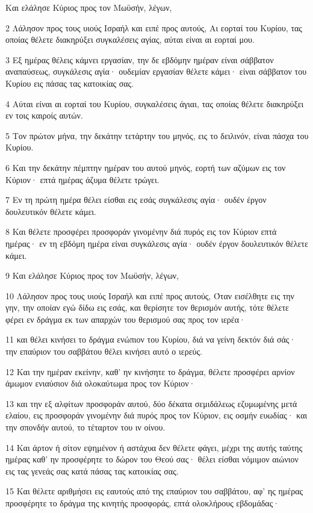 \par Και ελάλησε Κύριος προς τον Μωϋσήν, λέγων,
\par 2 Λάλησον προς τους υιούς Ισραήλ και ειπέ προς αυτούς, Αι εορταί του Κυρίου, τας οποίας θέλετε διακηρύξει συγκαλέσεις αγίας, αύται είναι αι εορταί μου.
\par 3 Εξ ημέρας θέλεις κάμνει εργασίαν, την δε εβδόμην ημέραν είναι σάββατον αναπαύσεως, συγκάλεσις αγία· ουδεμίαν εργασίαν θέλετε κάμει· είναι σάββατον του Κυρίου εις πάσας τας κατοικίας σας.
\par 4 Αύται είναι αι εορταί του Κυρίου, συγκαλέσεις άγιαι, τας οποίας θέλετε διακηρύξει εν τοις καιροίς αυτών.
\par 5 Τον πρώτον μήνα, την δεκάτην τετάρτην του μηνός, εις το δειλινόν, είναι πάσχα του Κυρίου.
\par 6 Και την δεκάτην πέμπτην ημέραν του αυτού μηνός, εορτή των αζύμων εις τον Κύριον· επτά ημέρας άζυμα θέλετε τρώγει.
\par 7 Εν τη πρώτη ημέρα θέλει είσθαι εις εσάς συγκάλεσις αγία· ουδέν έργον δουλευτικόν θέλετε κάμει.
\par 8 Και θέλετε προσφέρει προσφοράν γινομένην διά πυρός εις τον Κύριον επτά ημέρας· εν τη εβδόμη ημέρα είναι συγκάλεσις αγία· ουδέν έργον δουλευτικόν θέλετε κάμει.
\par 9 Και ελάλησε Κύριος προς τον Μωϋσήν, λέγων,
\par 10 Λάλησον προς τους υιούς Ισραήλ και ειπέ προς αυτούς, Όταν εισέλθητε εις την γην, την οποίαν εγώ δίδω εις εσάς, και θερίσητε τον θερισμόν αυτής, τότε θέλετε φέρει εν δράγμα εκ των απαρχών του θερισμού σας προς τον ιερέα·
\par 11 και θέλει κινήσει το δράγμα ενώπιον του Κυρίου, διά να γείνη δεκτόν διά σάς· την επαύριον του σαββάτου θέλει κινήσει αυτό ο ιερεύς.
\par 12 Και την ημέραν εκείνην, καθ' ην κινήσητε το δράγμα, θέλετε προσφέρει αρνίον άμωμον ενιαύσιον διά ολοκαύτωμα προς τον Κύριον·
\par 13 και την εξ αλφίτων προσφοράν αυτού, δύο δέκατα σεμιδάλεως εζυμωμένης μετά ελαίου, εις προσφοράν γινομένην διά πυρός προς τον Κύριον, εις οσμήν ευωδίας· και την σπονδήν αυτού, το τέταρτον του ιν οίνου.
\par 14 Και άρτον ή σίτον εψημένον ή αστάχυα δεν θέλετε φάγει, μέχρι της αυτής ταύτης ημέρας καθ' ην προσφέρητε το δώρον του Θεού σας· θέλει είσθαι νόμιμον αιώνιον εις τας γενεάς σας κατά πάσας τας κατοικίας σας.
\par 15 Και θέλετε αριθμήσει εις εαυτούς από της επαύριον του σαββάτου, αφ' ης ημέρας προσφέρητε το δράγμα της κινητής προσφοράς, επτά ολοκλήρους εβδομάδας·

